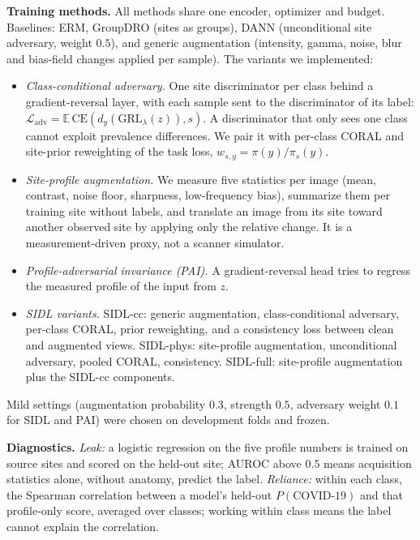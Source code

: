 \documentclass[10pt]{article}
\newcommand{\erm}{ERM}
\begin{document}
\textbf{Training methods.} All methods share one encoder, optimizer and budget. Baselines: \erm{}, GroupDRO (sites as groups), DANN (unconditional site adversary, weight $0.5$), and generic augmentation (intensity, gamma, noise, blur and bias-field changes applied per sample). The variants we implemented:
\begin{itemize}\setlength\itemsep{0pt}
  \item \emph{Class-conditional adversary.} One site discriminator per class behind a gradient-reversal layer, with each sample sent to the discriminator of its label: $\mathcal{L}_{\text{adv}}=\mathbb{E}\,\mathrm{CE}(d_y(\mathrm{GRL}_\lambda(z)),s)$. A discriminator that only sees one class cannot exploit prevalence differences. We pair it with per-class CORAL and site-prior reweighting of the task loss, $w_{s,y}=\pi(y)/\pi_s(y)$.
  \item \emph{Site-profile augmentation.} We measure five statistics per image (mean, contrast, noise floor, sharpness, low-frequency bias), summarize them per training site without labels, and translate an image from its site toward another observed site by applying only the relative change. It is a measurement-driven proxy, not a scanner simulator.
  \item \emph{Profile-adversarial invariance (PAI).} A gradient-reversal head tries to regress the measured profile of the input from $z$.
  \item \emph{SIDL variants.} SIDL-cc: generic augmentation, class-conditional adversary, per-class CORAL, prior reweighting, and a consistency loss between clean and augmented views. SIDL-phys: site-profile augmentation, unconditional adversary, pooled CORAL, consistency. SIDL-full: site-profile augmentation plus the SIDL-cc components.
\end{itemize}
Mild settings (augmentation probability $0.3$, strength $0.5$, adversary weight $0.1$ for SIDL and PAI) were chosen on development folds and frozen.

\textbf{Diagnostics.} \emph{Leak:} a logistic regression on the five profile numbers is trained on source sites and scored on the held-out site; AUROC above $0.5$ means acquisition statistics alone, without anatomy, predict the label. \emph{Reliance:} within each class, the Spearman correlation between a model's held-out $P(\text{COVID-19})$ and that profile-only score, averaged over classes; working within class means the label cannot explain the correlation.
\end{document}
